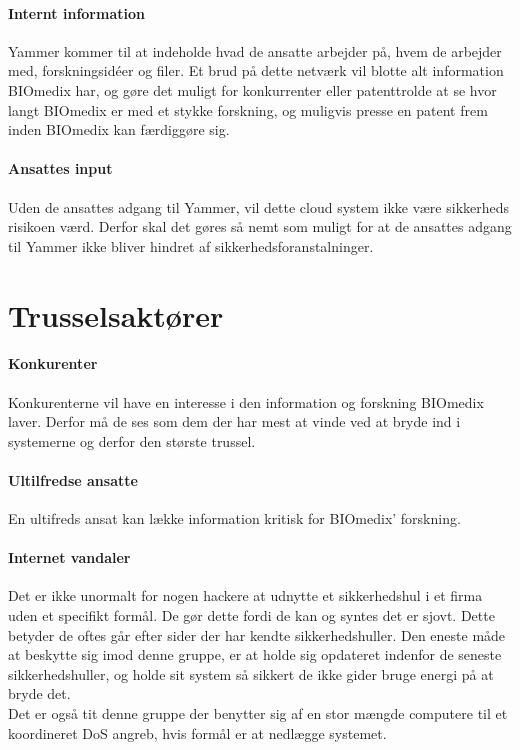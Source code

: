 \documentclass{article}
\begin{document}
\paragraph{Internt information}
Yammer kommer til at indeholde hvad de ansatte arbejder på, hvem de arbejder med, forskningsidéer og filer. Et brud på dette netværk vil blotte alt information BIOmedix har, og gøre det muligt for konkurrenter eller patenttrolde at se hvor langt BIOmedix er med et stykke forskning, og muligvis presse en patent frem inden BIOmedix kan færdiggøre sig. 

\paragraph{Ansattes input}
Uden de ansattes adgang til Yammer, vil dette cloud system ikke være sikkerheds risikoen værd. 
Derfor skal det gøres så nemt som muligt for at de ansattes adgang til Yammer ikke bliver 
hindret af sikkerhedsforanstalninger.  


\section{Trusselsaktører}


\paragraph{Konkurenter}
Konkurenterne vil have en interesse i den information og forskning BIOmedix laver.
Derfor må de ses som dem der har mest at vinde ved at bryde ind i systemerne og derfor
den største trussel.

\paragraph{Ultilfredse ansatte}
En ultifreds ansat kan lække information kritisk for BIOmedix' forskning.




\paragraph{Internet vandaler}
Det er ikke unormalt for nogen hackere at udnytte et sikkerhedshul i et firma
uden et specifikt formål. De gør dette fordi de kan og syntes det er sjovt. Dette
betyder de oftes går efter sider der har kendte sikkerhedshuller.
Den eneste måde at beskytte sig imod denne gruppe, er at holde sig opdateret indenfor de
seneste sikkerhedshuller, og holde sit system så sikkert de ikke gider bruge
energi på at bryde det.\\
Det er også tit denne gruppe der benytter sig af en stor mængde computere
til et koordineret DoS angreb, hvis formål er at nedlægge systemet.
\end{document}
